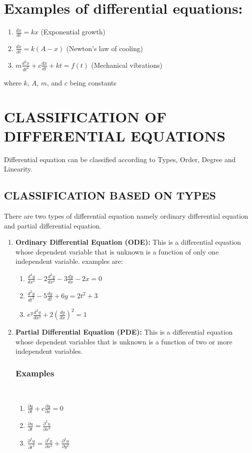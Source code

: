\documentclass[11pt]{report}
\newcommand{\spn}[1]{\\[#1cm]}
\newcommand{\bt}[1]{\textbf{#1}}
\newcommand{\dsp}{\displaystyle}
\newcommand{\examples}{\subsubsection*{Examples}{~}\spn{-1}}
\begin{document}
	\section*{Examples of differential equations:}
	\begin{enumerate}
		\item $\dsp \frac{dx}{dt} = kx$ (Exponential growth)
		
		\item $\dsp\frac{dx}{dt} = k(A-x)$ (Newton's law of cooling)
		
		\item $\dsp m\frac{d^2x}{dt^2} +c\frac{dx}{dt} + kt = f(t)$ (Mechanical vibrations)
	\end{enumerate}
	where $k$, $A$, $m$,  and $c$ being constants
	
	
	\section{CLASSIFICATION OF DIFFERENTIAL EQUATIONS }
	Differential equation can be classified according to Types, Order, Degree and Linearity.
	
	\subsection{CLASSIFICATION BASED ON TYPES}
	There are two types of differential equation namely ordinary differential equation and partial differential equation.
	\begin{enumerate}
		\item \bt{Ordinary Differential Equation (ODE):} This is a differential equation whose dependent variable that is unknown is a function of only one independent variable. examples are:
		\begin{enumerate}
			\item $\dsp \frac{d^4y}{dx^4} - 2\frac{d^2y}{dx^2} - 3\frac{dy}{dx} - 2x = 0$
			\item $\dsp \frac{d^2y}{dt^2} - 5\frac{dy}{dt} + 6y = 2t^2 + 3 $
			\item $\dsp e^y\frac{d^2y}{dx^2} + 2\left(\frac{dy}{dx}\right)^2 = 1$
		\end{enumerate}
		
		\item \bt{Partial Differential Equation (PDE):} This is a differential equation whose dependent variables that is unknown is a function of two or more independent variables.\spn{-1.3}
		\examples
		\begin{enumerate}
			\item $\dsp \frac{\partial y}{\partial t} + c\frac{\partial y}{\partial x} = 0$
			\item $\dsp \frac{\partial u}{\partial t} = \frac{\partial^2 u}{\partial x^2}$
			\item $\dsp \frac{\partial^2 u}{\partial t^2} = \frac{\partial^2 u}{\partial x^2} + \frac{\partial^2 u}{\partial y^2}$
		\end{enumerate}
	\end{enumerate}
	
\end{document}
